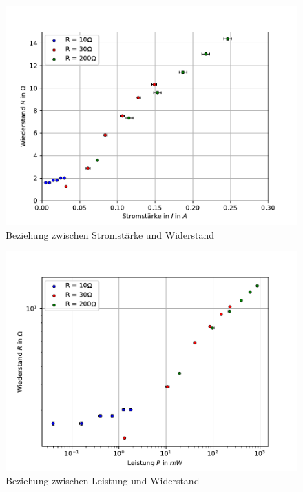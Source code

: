 \documentclass[11pt, a4paper]{article}
\begin{document}
    \begin{figure}
        \centering
        \includegraphics[width=\textwidth]{amp.pdf}
        \caption{Beziehung zwischen Stromstärke und Widerstand}
        \label{amp}
    \end{figure}
    \begin{figure}
        \centering
        \includegraphics[width=\textwidth]{pow.pdf}
        \caption{Beziehung zwischen Leistung und Widerstand}
        \label{pow}
    \end{figure}
\end{document}
